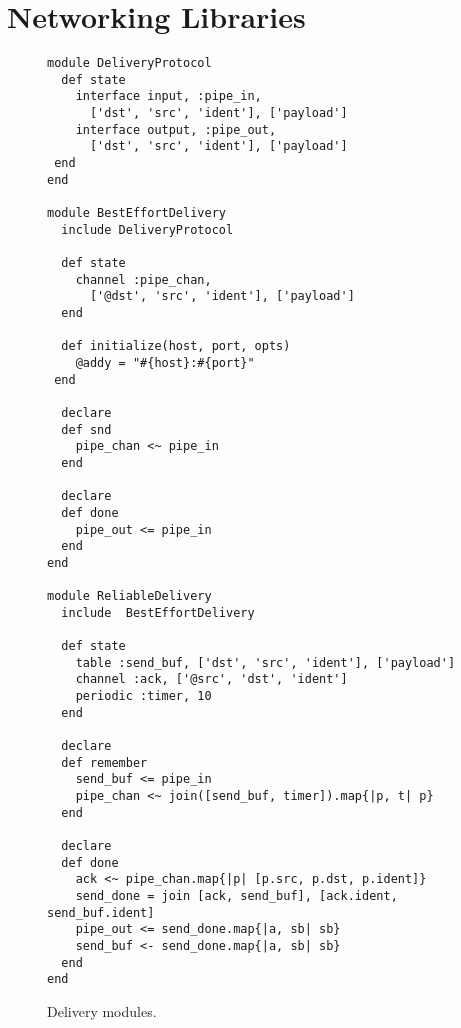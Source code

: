 \section{Networking Libraries}
\label{app:network-code}

\begin{figure}[t]
\begin{scriptsize}
\begin{lstlisting}
module DeliveryProtocol
  def state
    interface input, :pipe_in,
      ['dst', 'src', 'ident'], ['payload']
    interface output, :pipe_out,
      ['dst', 'src', 'ident'], ['payload']
 end
end

module BestEffortDelivery
  include DeliveryProtocol

  def state
    channel :pipe_chan,
      ['@dst', 'src', 'ident'], ['payload']
  end

  def initialize(host, port, opts)
    @addy = "#{host}:#{port}"
 end

  declare
  def snd
    pipe_chan <~ pipe_in
  end

  declare
  def done
    pipe_out <= pipe_in
  end
end

module ReliableDelivery
  include  BestEffortDelivery

  def state
    table :send_buf, ['dst', 'src', 'ident'], ['payload']
    channel :ack, ['@src', 'dst', 'ident']
    periodic :timer, 10
  end

  declare
  def remember
    send_buf <= pipe_in
    pipe_chan <~ join([send_buf, timer]).map{|p, t| p}
  end

  declare
  def done
    ack <~ pipe_chan.map{|p| [p.src, p.dst, p.ident]}
    send_done = join [ack, send_buf], [ack.ident, send_buf.ident]
    pipe_out <= send_done.map{|a, sb| sb}
    send_buf <- send_done.map{|a, sb| sb}
  end
end
\end{lstlisting}
\centering
\vspace{-10pt}
\caption{Delivery modules.}
\label{fig:delivery-impl}
\end{scriptsize}
\vspace{-2pt}
\end{figure}


